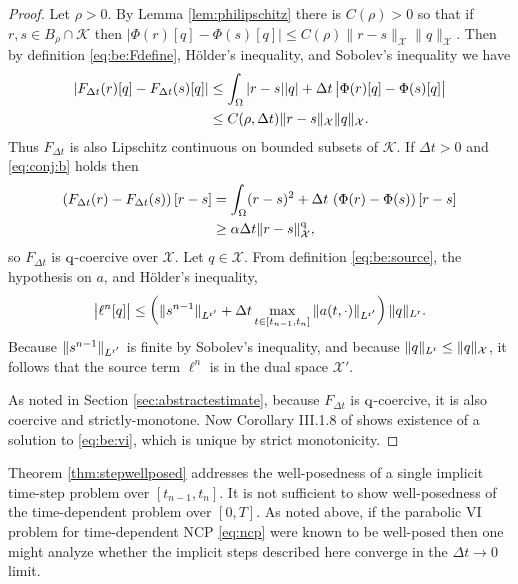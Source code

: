 \documentclass[hidelinks,onefignum,onetabnum,final]{siamart220329}  %
\newcommand{\cK}{\mathcal{K}}
\newcommand{\cX}{\mathcal{X}}
\newcommand{\qq}{{\text{\textnormal{q}}}}
\newcommand{\rr}{{\text{\textnormal{r}}}}
\begin{document}
\begin{proof}  Let $\rho>0$.  By Lemma \ref{lem:philipschitz} there is $C(\rho)>0$ so that if $r,s\in B_\rho\cap\cK$ then $\big|\Phi(r)[q] - \Phi(s)[q]\big| \le C(\rho) \|r-s\|_{\cX} \|q\|_{\cX}$.  Then by definition \eqref{eq:be:Fdefine}, H\"older's inequality, and Sobolev's inequality we have
\begin{align}
\left|F_{\Delta t}(r)[q] - F_{\Delta t}(s)[q]\right| &\le \int_\Omega |r-s||q| + \Delta t\, \big|\Phi(r)[q] - \Phi(s)[q]\big| \\
    &\le C(\rho,\Delta t) \|r-s\|_{\cX} \|q\|_\cX. \notag
\end{align}
Thus $F_{\Delta t}$ is also Lipschitz continuous on bounded subsets of $\cK$.  If $\Delta t>0$ and \eqref{eq:conj:b} holds then
\begin{align}
\left(F_{\Delta t}(r) - F_{\Delta t}(s)\right)[r-s] &= \int_\Omega (r-s)^2 + \Delta t\, \left(\Phi(r) - \Phi(s)\right)[r-s] \\
    &\ge \alpha\Delta t \|r-s\|_{\cX}^\qq, \notag
\end{align}
so $F_{\Delta t}$ is $\qq$-coercive over $\cX$.  Let $q\in\cX$.  From definition \eqref{eq:be:source}, the hypothesis on $a$, and H\"older's inequality,
\begin{equation}
\big|\ell^n[q]\big| \le \left(\|s^{n-1}\|_{L^{\rr'}} + \Delta t \max_{t\in[t_{n-1},t_n]} \|a(t,\cdot)\|_{L^{\rr'}}\right) \|q\|_{L^\rr}.
\label{eq:sourcetermbound}
\end{equation}
Because $\|s^{n-1}\|_{L^{\rr'}}$ is finite by Sobolev's inequality, and because $\|q\|_{L^\rr} \le \|q\|_{\cX}$, it follows that the source term $\ell^n$ is in the dual space $\cX'$.

As noted in Section \ref{sec:abstractestimate}, because $F_{\Delta t}$ is $\qq$-coercive, it is also coercive and strictly-monotone.  Now Corollary III.1.8 of \cite{KinderlehrerStampacchia1980} shows existence of a solution to \eqref{eq:be:vi}, which is unique by strict monotonicity.
\end{proof}

Theorem \ref{thm:stepwellposed} addresses the well-posedness of a single implicit time-step problem over $[t_{n-1},t_n]$.  It is not sufficient to show well-posedness of the time-dependent problem over $[0,T]$.  As noted above, if the parabolic VI problem for time-dependent NCP \eqref{eq:ncp} were known to be well-posed then one might analyze whether the implicit steps described here converge in the $\Delta t\to 0$ limit.
\end{document}
